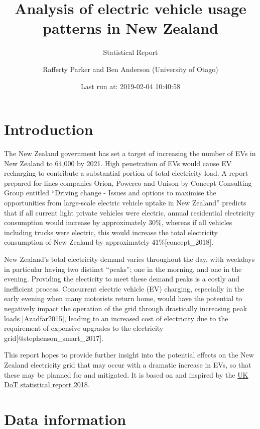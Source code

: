 \documentclass[]{article}
\title{Analysis of electric vehicle usage patterns in New Zealand}
\subtitle{Statistical Report}
\author{Rafferty Parker and Ben Anderson (University of Otago)}
\date{Last run at: 2019-02-04 10:40:58}
\begin{document}
\maketitle

{
\setcounter{tocdepth}{2}
\tableofcontents
}
\section{Introduction}\label{introduction}

The New Zealand government has set a target of increasing the number of
EVs in New Zealand to 64,000 by 2021. High penetration of EVs would
cause EV recharging to contribute a substantial portion of total
electricity load. A report prepared for lines companies Orion, Powerco
and Unison by Concept Consulting Group entitled ``Driving change -
Issues and options to maximise the opportunities from large-scale
electric vehicle uptake in New Zealand'' predicts that if all current
light private vehicles were electric, annual residential electricity
consumption would increase by approximately 30\%, whereas if all
vehicles including trucks were electric, this would increase the total
electricity consumption of New Zealand by approximately
41\%{[}concept\_2018{]}.

New Zealand's total electricity demand varies throughout the day, with
weekdays in particular having two distinct ``peaks''; one in the
morning, and one in the evening. Providing the electicity to meet these
demand peaks is a costly and inefficient process. Concurrent electric
vehicle (EV) charging, especially in the early evening when many
motorists return home, would have the potential to negatively impact the
operation of the grid through drastically increasing peak loads
{[}Azadfar2015{]}, leading to an increased cost of electricity due to
the requirement of expensive upgrades to the electricity
grid{[}@stephenson\_smart\_2017{]}.

This report hopes to provide further insight into the potential effects
on the New Zealand electricity grid that may occur with a dramatic
increase in EVs, so that these may be planned for and mitigated. It is
based on and inspired by the
\href{https://assets.publishing.service.gov.uk/government/uploads/system/uploads/attachment_data/file/764270/electric-chargepoint-analysis-2017-domestics.pdf}{UK
DoT statistical report 2018}.

\section{Data information}\label{data}
\end{document}
